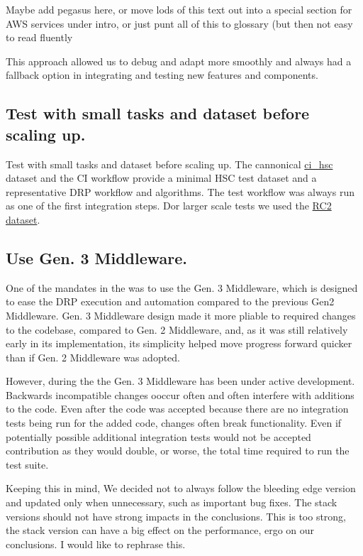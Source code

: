 {\color{red} Maybe add pegasus here, or move lods of this text out into a special section for AWS services under intro, or just punt all of this to glossary (but then not easy to read fluently}

This approach allowed us to debug and adapt more smoothly and always had a fallback option in integrating and testing new features and components.

\subsection{Test with small tasks and dataset before scaling up.}

Test with small tasks and dataset before scaling up. The cannonical \href{https://github.com/lsst/ci\_hsc}{ci\_hsc} dataset and the CI workflow provide a minimal HSC test dataset and a representative DRP workflow and algorithms.
The test workflow was always run as one of the first integration steps. Dor larger scale tests we used the \href{https://jira.lsstcorp.org/browse/DM-11345}{RC2 dataset}. 

\subsection{Use Gen. 3 Middleware.}

One of the mandates in the \poc was to use the Gen. 3 Middleware, which is designed to ease the DRP execution and automation compared to the previous Gen2 Middleware. Gen. 3 Middleware design made it more pliable to required changes to the codebase, compared to Gen. 2 Middleware, and, as it was still relatively early in its implementation, its simplicity helped move progress forward quicker than if Gen. 2 Middleware was adopted.

However, during the \poc the Gen. 3 Middleware has been under active development. Backwards incompatible changes ooccur often and often interfere with additions to the code. Even after the code was accepted because there are no integration tests being run for the added code, changes often break functionality. Even if potentially possible additional integration tests would not be accepted contribution as they would double, or worse, the total time required to run the test suite. 

Keeping this in mind, We decided not to always follow the bleeding edge version and updated only when unnecessary, such as important bug fixes. The stack versions should not have strong impacts in the \poc conclusions. {\color{red} This is too strong, the stack version can have a big effect on the performance, ergo on our conclusions. I would like to rephrase this.} 

